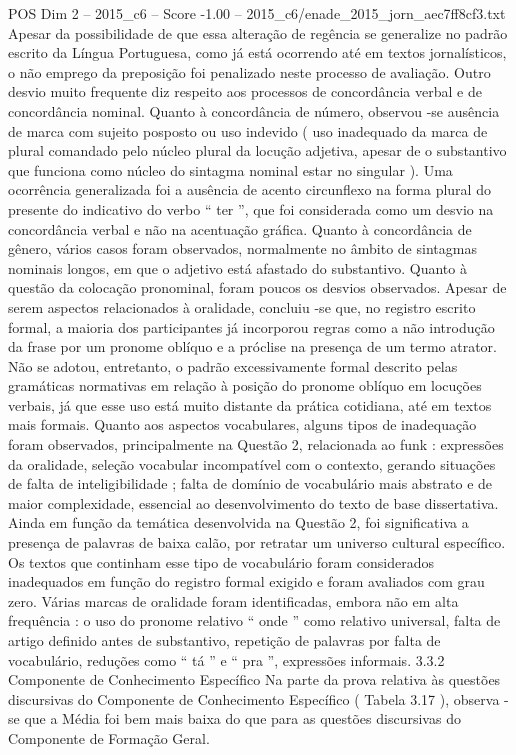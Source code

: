 \begin{textsample}{POS Dim 2 – 2015\_c6 – Score -1.00 – 2015\_c6/enade\_2015\_jorn\_aec7ff8cf3.txt}
Apesar da possibilidade de que essa alteração de regência se generalize no padrão escrito da Língua Portuguesa, como já está ocorrendo até em textos jornalísticos, o não emprego da preposição foi penalizado neste processo de avaliação.
Outro desvio muito frequente diz respeito aos processos de concordância verbal e de concordância nominal.
Quanto à concordância de número, observou -se ausência de marca com sujeito posposto ou uso indevido ( uso inadequado da marca de plural comandado pelo núcleo plural da locução adjetiva, apesar de o substantivo que funciona como núcleo do sintagma nominal estar no singular ).
Uma ocorrência generalizada foi a ausência de acento circunflexo na forma plural do presente do indicativo do verbo “ ter ”, que foi considerada como um desvio na concordância verbal e não na acentuação gráfica.
Quanto à concordância de gênero, vários casos foram observados, normalmente no âmbito de sintagmas nominais longos, em que o adjetivo está afastado do substantivo.
Quanto à questão da colocação pronominal, foram poucos os desvios observados.
Apesar de serem aspectos relacionados à oralidade, concluiu -se que, no registro escrito formal, a maioria dos participantes já incorporou regras como a não introdução da frase por um pronome oblíquo e a próclise na presença de um termo atrator.
Não se adotou, entretanto, o padrão excessivamente formal descrito pelas gramáticas normativas em relação à posição do pronome oblíquo em locuções verbais, já que esse uso está muito distante da prática cotidiana, até em textos mais formais.
Quanto aos aspectos vocabulares, alguns tipos de inadequação foram observados, principalmente na Questão 2, relacionada ao funk : expressões da oralidade, seleção vocabular incompatível com o contexto, gerando situações de falta de inteligibilidade ; falta de domínio de vocabulário mais abstrato e de maior complexidade, essencial ao desenvolvimento do texto de base dissertativa.
Ainda em função da temática desenvolvida na Questão 2, foi significativa a presença de palavras de baixa calão, por retratar um universo cultural específico.
Os textos que continham esse tipo de vocabulário foram considerados inadequados em função do registro formal exigido e foram avaliados com grau zero.
Várias marcas de oralidade foram identificadas, embora não em alta frequência : o uso do pronome relativo “ onde ” como relativo universal, falta de artigo definido antes de substantivo, repetição de palavras por falta de vocabulário, reduções como “ tá ” e “ pra ”, expressões informais. 3.3.2 Componente de Conhecimento Específico Na parte da prova relativa às questões discursivas do Componente de Conhecimento Específico ( Tabela 3.17 ), observa -se que a Média foi bem mais baixa do que para as questões discursivas do Componente de Formação Geral.

\end{textsample}
